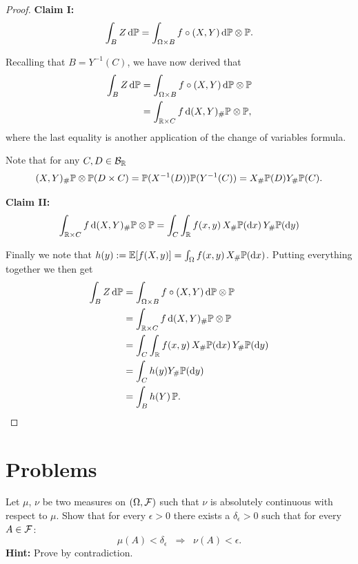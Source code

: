 \begin{proof}
\textbf{Claim I:}
\[
	\int_{B} Z \, \mathrm{d} \mathbb P = \int_{\Omega \times B} f \circ (X,Y) \, \mathrm{d} \mathbb P \otimes \mathbb P.
\]

Recalling that $B = Y^{-1}(C)$, we have now derived that
\begin{align*}
	\int_{B} Z \, \mathrm{d} \mathbb P &= \int_{\Omega \times B} f \circ (X,Y) \, \mathrm{d} \mathbb P \otimes \mathbb P\\
	&= \int_{\mathbb R \times C} f \, \mathrm{d} (X,Y)_\# \mathbb P \otimes \mathbb P,
\end{align*}
where the last equality is another application of the change of variables formula.

Note that for any $C, D \in \mathcal B_{\mathbb R}$
\[
	(X,Y)_\# \mathbb P \otimes \mathbb P(D \times C) = \mathbb P(X^{-1}(D)) \mathbb P(Y^{-1}(C)) 
	= X_\# \mathbb P(D) Y_\# \mathbb P(C).
\]

\textbf{Claim II:}
\[
	\int_{\mathbb R \times C} f \, \mathrm{d} (X,Y)_\# \mathbb P \otimes \mathbb P
	= \int_C \int_{\mathbb R} f(x,y) \, X_\#\mathbb P(\mathrm{d} x) \, Y_\# \mathbb P (\mathrm{d} y)
\]

Finally we note that $h(y) := \mathbb E[f(X,y)] = \int_\Omega f(x,y) \, X_\#\mathbb P(\mathrm{d} x)$. Putting everything together we then get
\begin{align*}
	\int_{B} Z \, \mathrm{d} \mathbb P &= \int_{\Omega \times B} f \circ (X,Y) \, \mathrm{d} \mathbb P \otimes \mathbb P\\
	&= \int_{\mathbb R \times C} f \, \mathrm{d} (X,Y)_\# \mathbb P \otimes \mathbb P\\
	&= \int_C \int_{\mathbb R} f(x,y) \, X_\#\mathbb P(\mathrm{d} x) \, Y_\# \mathbb P (\mathrm{d} y)\\
	&= \int_C h(y) Y_\# \mathbb P(\mathrm{d} y) \\
	&= \int_B h(Y) \, \mathbb P.
\end{align*}

\end{proof}

\section{Problems}

\begin{problem}
	Let $\mu$, $\nu$ be two measures on $(\Omega, \mathcal F)$ such that $\nu$ is absolutely continuous with respect to $\mu$. Show that for every $\epsilon > 0$ there exists a $\delta_\epsilon > 0$ such that for every $A \in \mathcal F$:
	\[
		\mu(A) < \delta_\epsilon\;\;\Longrightarrow\;\; \nu(A) < \epsilon.
	\]
	\textbf{Hint:} Prove by contradiction.
\end{problem}



